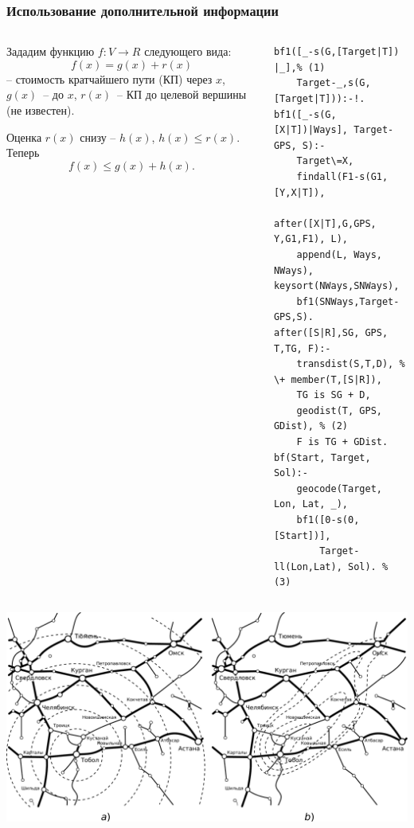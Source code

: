 \documentclass[10pt]{beamer}
\begin{document}
\begin{frame}[fragile]
  \frametitle{Использование дополнительной информации}
  \begin{columns}
    \begin{column}{0.5\textwidth}\footnotesize
      Зададим функцию $f\!\!:V\to R$ следующего вида:
\begin{equation*}
  f(x)=g(x)+r(x)
\end{equation*}
-- стоимость кратчайшего пути (КП) через $x$,  $g(x)$~-- до $x$, $r(x)$~-- КП до целевой вершины (не известен).

Оценка $r(x)$ снизу -- $h(x)$, $h(x)\leqslant r(x)$.  Теперь
\begin{equation*}
  f(x)\leqslant g(x)+h(x).
\end{equation*}
    \end{column}
    \begin{column}{0.5\textwidth}
\begin{verbatim}
bf1([_-s(G,[Target|T]) |_],% (1)
    Target-_,s(G,[Target|T])):-!.
bf1([_-s(G,[X|T])|Ways], Target-GPS, S):-
    Target\=X,
    findall(F1-s(G1,[Y,X|T]),
      after([X|T],G,GPS, Y,G1,F1), L),
    append(L, Ways, NWays), keysort(NWays,SNWays),
    bf1(SNWays,Target-GPS,S).
after([S|R],SG, GPS, T,TG, F):-
    transdist(S,T,D), % \+ member(T,[S|R]),
    TG is SG + D,
    geodist(T, GPS, GDist), % (2)
    F is TG + GDist.
bf(Start, Target, Sol):-
    geocode(Target, Lon, Lat, _),
    bf1([0-s(0,[Start])],
        Target-ll(Lon,Lat), Sol). % (3)
\end{verbatim}
    \end{column}
  \end{columns}
  \begin{center}
    \includegraphics[width=0.7\linewidth]{pics/yuzd1.pdf}
  \end{center}
\end{frame}
\end{document}
